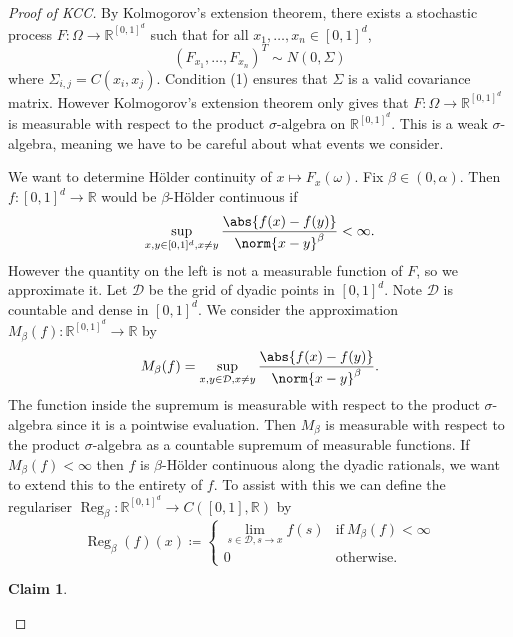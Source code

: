 \documentclass[fontsize=12pt, DIV=10]{scrreprt}
\newtheorem{claim}{Claim}
\theoremstyle{remark}
\newcommand{\defeq}{\coloneqq}
\newcommand{\R}{\mathbb R}
\newcommand{\indi}{\mathbb 1}
\newcommand{\calD}{\mathcal D}
\DeclareMathOperator{\reg}{Reg}
\newcommand{\boxspace}{\ensuremath{\R^{[0, 1]^d}}}
\newcommand{\unitbox}{\ensuremath{[0,1]^d}}
\begin{document}
\begin{proof}[Proof of KCC]
	By Kolmogorov's extension theorem, there exists a stochastic process $F: \Omega \to \boxspace$ such that for all $x_1, \ldots, x_n \in [0, 1]^d$, 
	\begin{equation}
		(F_{x_1}, \ldots, F_{x_n})^T
		\sim N(0, \Sigma)
	\end{equation}
	where $\Sigma_{i,j} = C(x_i, x_j)$. Condition (1) ensures that $\Sigma$ is a valid covariance matrix. However Kolmogorov's extension theorem only gives that $F: \Omega \to \boxspace$ is measurable with respect to the product $\sigma$-algebra on $\boxspace$. This is a weak $\sigma$-algebra, meaning we have to be careful about what events we consider.

	We want to determine H\"older continuity of $x \mapsto F_{x}(\omega)$. Fix $\beta \in (0, \alpha)$. Then $f: \unitbox \to \R$ would be $\beta$-H\"older continuous if
	\begin{equation}
		\sup_{x, y \in [0, 1]^d, x \neq y} \frac{\abs{f(x) - f(y)}}{\norm{x - y}^{\beta}} < \infty.
	\end{equation}
	However the quantity on the left is not a measurable function of $F$, so we approximate it. Let $\calD$ be the grid of dyadic points in $[0, 1]^d$. Note $\calD$ is countable and dense in $[0, 1]^d$. We consider the approximation $M_{\beta}(f): \boxspace \to \R$ by
	\begin{equation}
		M_{\beta}(f) = \sup_{x, y \in \calD, x \neq y} \frac{\abs{f(x) - f(y)}}{\norm{x - y}^{\beta}}.
	\end{equation}
	The function inside the supremum is measurable with respect to the product $\sigma$-algebra since it is a pointwise evaluation. Then $M_{\beta}$ is measurable with respect to the product $\sigma$-algebra as a countable supremum of measurable functions. If $M_{\beta}(f) < \infty$ then $f$ is $\beta$-H\"older continuous along the dyadic rationals, we want to extend this to the entirety of $f$. To assist with this we can define the regulariser $\reg_{\beta}: \boxspace \to C([0, 1], \R)$ by
	\begin{equation}
		\reg_{\beta}(f)(x) \defeq 
		\begin{cases}
			\lim_{s \in \calD, s \to x} f(s) & \text{if}\ M_{\beta}(f) < \infty \\
			0 & \text{otherwise}.
		\end{cases}
	\end{equation}
	\newcommand{\regindi}{\ensuremath{\indi_{\{M_{\beta}(f) < \infty\}}}}
	\begin{claim}

\end{claim}
\end{proof}
\end{document}

